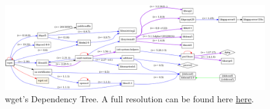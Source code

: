 \begin{figure}[H]
    \centering
    \includegraphics[width=\textwidth]{images/deps/wget.png}
    \caption{wget's Dependency Tree. A full resolution can be found here \href{https://raw.githubusercontent.com/antonPalmFolkmann/DevOps2022/main/report/images/deps/wget.png}{here}.}
    \label{app:fig:wget_dep_tree}
\end{figure}
